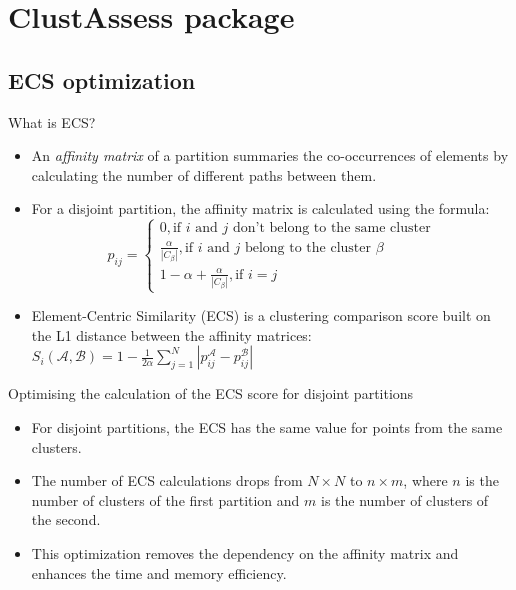 \section{ClustAssess package}

\subsection{ECS optimization}

\begin{frame}[label=ecs-first]{What is ECS?}
    \begin{itemize}
        \item An \textit{affinity matrix} of a partition summaries the co-occurrences of elements by calculating the number of different paths between them.
        \item  For a disjoint partition, the affinity matrix is calculated using the formula: \begin{equation*} \label{eq:affinity-disjoin}
                  p_{ij} =
                  \begin{cases}
                      0, \text{if } i \text{ and } j \text{ don't belong to the same cluster}                  \\
                      \frac{\alpha}{|C_\beta|}, \text{if }i\text{ and } j \text{ belong to the cluster } \beta \\
                      1 - \alpha + \frac{\alpha}{|C_\beta|}, \text{if } i = j
                  \end{cases}
              \end{equation*}
        \item Element-Centric Similarity (ECS) \cite{Gates2019} is a clustering comparison score built on the L1 distance between the affinity matrices: $ \displaystyle S_i (\mathcal{A}, \mathcal{B}) = 1 - \frac{1}{2 \alpha} \sum_{j = 1}^N |p_{ij}^{\mathcal{A}} - p_{ij}^{\mathcal{B}}|$
    \end{itemize}

    \hyperlink{app1}{}

\end{frame}

\begin{frame}[label=optslide]{Optimising the calculation of the ECS score for disjoint partitions}
    \begin{itemize}
        \item For disjoint partitions, the ECS has the same value for points from the same clusters.
        \item The number of ECS calculations drops from $N \times N$ to $n \times m$, where $n$ is the number of clusters of the first partition and $m$ is the number of clusters of the second. 
        \item This optimization removes the dependency on the affinity matrix and enhances the time and memory efficiency.

    \end{itemize}
    
    \hyperlink{proof}{}
\end{frame}

